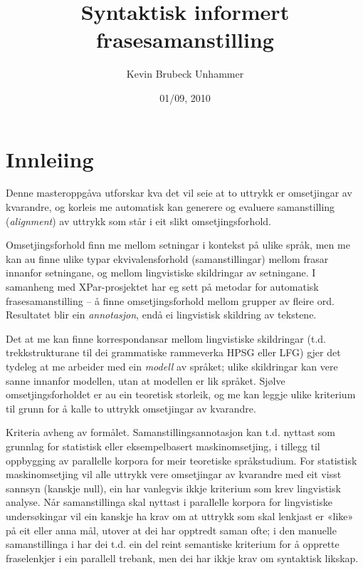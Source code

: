 \documentclass[11pt,a4paper,oneside,draft]{book}
\title{Syntaktisk informert frasesamanstilling }
\author{Kevin Brubeck Unhammer}
\date{01/09, 2010}
\begin{document}
\maketitle

\setcounter{tocdepth}{4}
\tableofcontents
\vspace*{1cm}



\chapter{Innleiing}
\label{sec-1}

\label{SEC:innleiing}


Denne masteroppgåva utforskar kva det vil seie at to uttrykk er
omsetjingar av kvarandre, og korleis me automatisk kan generere og
evaluere samanstilling (\emph{alignment}) av uttrykk som
står i eit slikt omsetjingsforhold. 

Omsetjingsforhold finn me mellom setningar i kontekst på ulike språk,
men me kan au finne ulike typar ekvivalensforhold (samanstillingar)
mellom frasar innanfor setningane, og mellom lingvistiske
skildringar av setningane. I samanheng med XPar-prosjektet
\citep{xpar2008rcn} har eg sett på metodar for automatisk
frasesamanstilling – å finne omsetjingsforhold mellom grupper av
fleire ord. Resultatet blir ein \emph{annotasjon}, endå ei lingvistisk
skildring av tekstene.



Det at me kan finne korrespondansar mellom lingvistiske skildringar
(t.d. trekkstrukturane til dei grammatiske rammeverka HPSG eller LFG)
gjer det tydeleg at me arbeider med ein \emph{modell} av språket; ulike
skildringar kan vere sanne innanfor modellen, utan at modellen er lik
språket. Sjølve omsetjingsforholdet er au ein teoretisk storleik, og
me kan leggje ulike kriterium til grunn for å kalle to uttrykk
omsetjingar av kvarandre.

Kriteria avheng av formålet. Samanstillingsannotasjon kan t.d. nyttast
som grunnlag for statistisk eller eksempelbasert maskinomsetjing, i
tillegg til oppbygging av parallelle korpora for meir teoretiske
språkstudium.  For statistisk maskinomsetjing vil alle uttrykk vere
omsetjingar av kvarandre med eit visst sannsyn (kanskje null), ein
har vanlegvis ikkje kriterium som krev lingvistisk analyse. Når
samanstillinga skal nyttast i parallelle korpora for lingvistiske
undersøkingar vil ein kanskje ha krav om at uttrykk som skal lenkjast
er «like» på eit eller anna mål, utover at dei har opptredt saman
ofte; i den manuelle samanstillinga i \citet{samuelsson2006pap} har
dei t.d. ein del reint semantiske kriterium for å opprette
fraselenkjer i ein parallell trebank, men dei har ikkje krav om
syntaktisk likskap.
\end{document}
